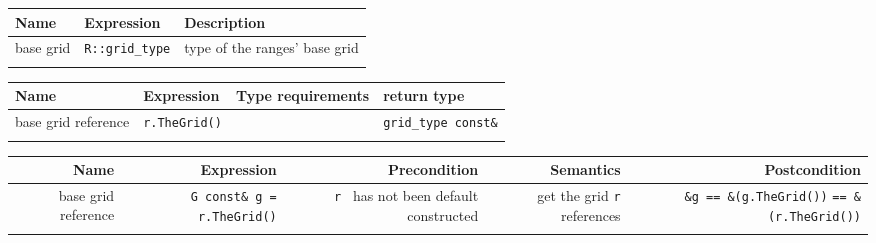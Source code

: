 
    \begin{tabular}{lll} \\
      \hline
      \bf  Name  &\bf  Expression  &\bf  Description   \\ 
      \hline
      base grid &
      {\tt  R::grid\_type}  &
      type of the  ranges' base grid 
      \\ 
      \hline
      \\
    \end{tabular}
 

   \begin{tabular}{llll} \\
     \hline
       \bf  Name  &\bf  Expression  &\bf  Type requirements  & \bf  return type  \\ 
       \hline
       base grid reference  &
       {\tt  r.TheGrid()}  &
       & 
       {\tt  grid\_type const\&}  \\ 
       \hline
       \\
    \end{tabular}

   
    \begin{tabularx}{14cm}{RRRRR} \\
      \hline
      \bf  Name       &
      \bf  Expression &
      \bf  Precondition&
      \bf   Semantics &
      \bf   Postcondition
      \\
      \hline
      base grid   reference  &
      {\tt G const\&  g = r.TheGrid()}  &
      {\tt r } has not been default constructed &
      get the grid {\tt  r} references  &
      {\tt  \&g == \&(g.TheGrid())} {\tt == \&(r.TheGrid())}  \\ 
    \hline
    \\
  \end{tabularx}

  \W{}

     ~
    \W\\
     ~
    \W\\
     ~
    \W\\
     ~
    \W\\
    
